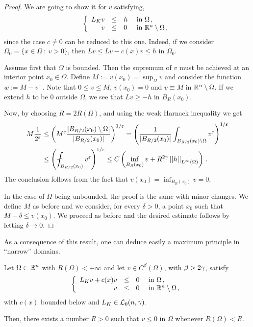 \begin{proof}
	We are going to show it for $v$ satisfying,
	$$
	\left\{\begin{array}{rcll}
	L_K v &\leq & h & \text{ in } \Omega\,, \\
	v & \leq & 0 & \text{ in } \mathbb{R}^n\setminus \Omega\,,
	\end{array} \right.
	$$
	since the case $c\neq 0$ can be reduced to this one. Indeed, if we consider $\Omega_0 = \{x \in \Omega \ : \ v > 0\}$, then $Lv \leq Lv - c(x)v \leq h$ in $\Omega_0$.
	
	Assume first that $\Omega$ is bounded. Then the supremum of $v$ must be achieved at an interior point $x_0\in \Omega$. Define	$M:= v(x_0) = \sup_\Omega v$ and consider the function $w := M - v^+$. Note that $0 \leq v \leq M$, $v(x_0) = 0$ and $v \equiv M$ in $\mathbb{R}^n \setminus \Omega$. If we extend $h$ to be $0$ outside $\Omega$, we see that $Lv \geq -h$ in $B_R(x_0)$.
	
	Now, by choosing $R= 2R(\Omega)$, and using the weak Harnack inequality  we get
	\begin{align*}
	M \dfrac{1}{2^\varepsilon} & \leq \bpar{M^{\varepsilon}\dfrac{|B_{R/2}(x_0)\setminus \Omega|}{|B_{R/2}(x_0)|}}^{1/\varepsilon}= \bpar{\dfrac{1}{|B_{R/2}(x_0)|} \int_{B_{R/2}(x_0)\setminus \Omega} v^\varepsilon}^{1/\varepsilon} \\
	& \leq \bpar{ \fint_{B_{R/2}(x_0)} v^\varepsilon}^{1/\varepsilon} \leq C \bpar{\inf_{B_{R}(x_0)} v + R^{2\s} \norm{h}_{L^{\infty}(\Omega)} }\,.
	\end{align*}
	The conclusion follows from the fact that $v(x_0)= \inf_{B_{R}(x_0)} v = 0$.
	
	In the case of $\Omega$ being unbounded, the proof is the same with minor changes. We define $M$ as before and we consider, for every $\delta > 0$, a point $x_0$ such that $M-\delta \leq v(x_0)$. We proceed as before and the desired estimate follows by letting $\delta \to 0$.
\end{proof}




As a consequence of this result, one can deduce easily a maximum principle in ``narrow'' domains.

\begin{corollary}
	\label{Cor:MaxPpleNarrowDomains}
	Let $\Omega \subset \mathbb{R}^n$ with $R(\Omega) < +\infty$ and let $v\in C^{\beta}(\Omega)$, with $\beta > 2\gamma$, satisfy
	$$
	\left\{\begin{array}{rcll}
	L_K v + c(x)v &\leq & 0 & \text{ in } \Omega\,, \\
	v & \leq & 0 & \text{ in } \mathbb{R}^n\setminus \Omega\,,
	\end{array} \right.
	$$
	with $c(x)$ bounded below and $L_K \in \mathcal{L}_0(n,\gamma)$.
	
	Then, there exists a number $\bar{R} > 0$ such that $v \leq 0$ in $\Omega$ whenever $R(\Omega)< \bar{R}$.
	
\end{corollary}

